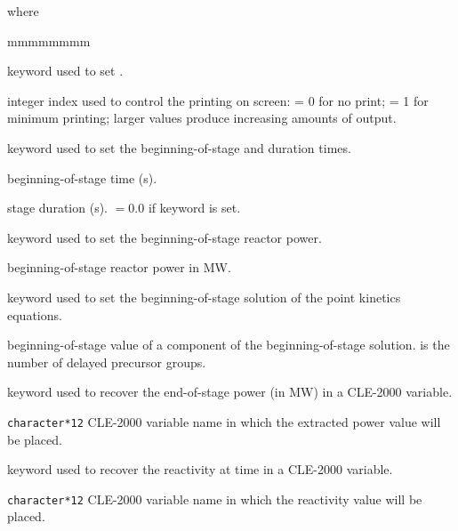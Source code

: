 \noindent where
\begin{ListeDeDescription}{mmmmmmmm}

\item[\moc{EDIT}] keyword used to set .

\item[\dusa{iprint}] integer index used to control the printing on screen:
= 0 for no print; = 1 for minimum printing; larger values produce
increasing amounts of output.

\item[\moc{TIME}] keyword used to set the beginning-of-stage and duration times.

\item[\dusa{t0}] beginning-of-stage time (s).

\item[\dusa{dt}] stage duration (s).  $=0.0$ if keyword  is set.

\item[\moc{POWER}] keyword used to set the beginning-of-stage reactor power.

\item[\dusa{power}] beginning-of-stage reactor power in MW.

\item[\moc{Y-INIT}] keyword used to set the beginning-of-stage solution of the point kinetics equations.

\item[\dusa{y}] beginning-of-stage value of a component of the beginning-of-stage solution.  is the
number of delayed precursor groups.

\item[\moc{PICK}]  keyword used to recover the end-of-stage power (in MW) in a CLE-2000 variable.

\item[\dusa{power\_out}] \texttt{character*12} CLE-2000 variable name in which the extracted power value will be placed.

\item[\moc{PICKR}]  keyword used to recover the reactivity at time  in a CLE-2000 variable.

\item[\dusa{rho}] \texttt{character*12} CLE-2000 variable name in which the reactivity value will be placed.

\end{ListeDeDescription}
\clearpage
